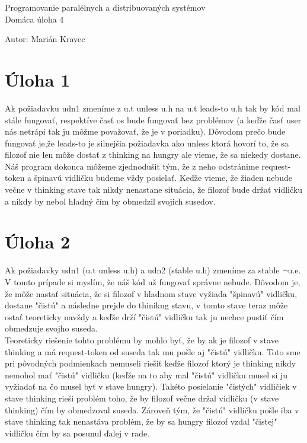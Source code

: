 \documentclass[a4paper]{article}
\begin{document}
 
	
\pagestyle{plain}

\begin{center}
	\sc\large
	Programovanie paralélnych a distribuovaných systémov\\
	Domáca úloha 4
\end{center}

Autor: Marián Kravec

\section{Úloha 1}

Ak požiadavku udn1 zmeníme z u.t unless u.h na u.t leads-to u.h tak by kód mal stále fungovať, respektíve časť os bude fungovať bez problémov (a keďže časť user nás netrápi tak ju môžme považovať, že je v poriadku). Dôvodom prečo bude fungovať je,že leads-to je silnejšia požiadavka ako unless ktorá hovorí to, že sa filozof nie len môže dostať z thinking na hungry ale vieme, že sa niekedy dostane.
\\

Náš program dokonca môžeme zjednodušiť tým, že z neho odstránime request-token a špinavú vidličku budeme vždy posielať. Keďže vieme, že žiaden nebude večne v thinking stave tak nikdy nenastane situácia, že filozof bude držať vidličku a nikdy by nebol hladný čím by obmedzil svojich susedov.   

\section{Úloha 2}

Ak požiadavky udn1 (u.t unless u.h) a udn2 (stable u.h) zmeníme za stable $\neg$u.e. V tomto prípade si myslím, že náš kód už fungovať správne nebude. Dôvodom je, že môže nastať situácia, že si filozof v hladnom stave vyžiada "špinavú" vidličku, dostane "čistú" a následne prejde do thinikng stavu, v tomto stave teraz môže ostať teoreticky navždy a keďže drží "čistú" vidličku tak ju nechce pustiť čím obmedzuje svojho suseda.
\\

Teoreticky riešenie tohto problému by mohlo byť, že by ak je filozof v stave thinking a má request-token od suseda tak mu pošle aj "čistú" vidličku. Toto sme pri pôvodných podmienkach nemuseli riešiť keďže filozof ktorý je thinking nikdy nemohol mať "čistú" vidličku (keďže na to aby mal "čistú" vidličku musel si ju vyžiadať na čo musel byť v stave hungry). Takéto posielanie "čistých" vidličiek v stave thinking rieši problém toho, že by filozof večne držal vidličku (v stave thinking) čím by obmedzoval suseda. Zároveň tým, že "čistú" vidličku pošle iba v stave thinking tak nenastáva problém, že by sa hungry filozof vzdal "čistej" vidličku čím by sa posunul ďalej v rade. 
\end{document}
